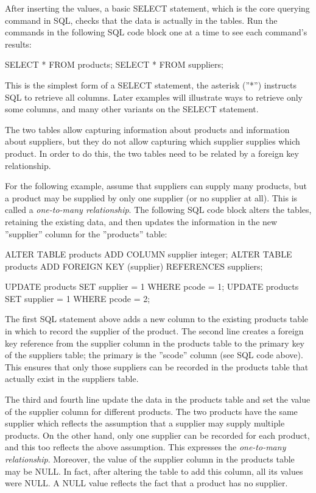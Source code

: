 After inserting the values, a basic SELECT statement, which is the core querying command in SQL, checks that the data is actually in the tables. Run the commands in the following SQL code block one at a time to see each command's results:

\begin{samepage}
\begin{sqlcode}
SELECT * FROM products;
SELECT * FROM suppliers;
\end{sqlcode}
\end{samepage}

This is the simplest form of a SELECT statement, the asterisk (''*'') instructs SQL to retrieve all columns. Later examples will illustrate ways to retrieve only some columns, and many other variants on the SELECT statement.

The two tables allow capturing information about products and information about suppliers, but they do not allow capturing which supplier supplies which product. In order to do this, the two tables need to be related by a foreign key relationship. 

For the following example, assume that suppliers can supply many products, but a product may be supplied by only one supplier (or no supplier at all). This is called a \emph{one-to-many relationship}. The following SQL code block alters the tables, retaining the existing data, and then updates the information in the new ''supplier'' column for the ''products'' table:

\begin{samepage}
\begin{sqlcode}
ALTER TABLE products ADD COLUMN supplier integer;
ALTER TABLE products ADD FOREIGN KEY (supplier) REFERENCES suppliers;

UPDATE products SET supplier = 1 WHERE pcode = 1;
UPDATE products SET supplier = 1 WHERE pcode = 2;
\end{sqlcode}
\end{samepage}

The first SQL statement above adds a new column to the existing products table in which to record the supplier of the product. The second line creates a foreign key reference from the supplier column in the products table to the primary key of the suppliers table; the primary is the ''scode'' column (see SQL code above). This ensures that only those suppliers can be recorded in the products table that actually exist in the suppliers table. 

The third and fourth line update the data in the products table and set the value of the supplier column for different products. The two products have the same supplier which reflects the assumption that a supplier may supply multiple products. On the other hand, only one supplier can be recorded for each product, and this too reflects the above assumption. This expresses the \emph{one-to-many relationship}. Moreover, the value of the supplier column in the products table may be NULL. In fact, after altering the table to add this column, all its values were NULL. A NULL value reflects the fact that a product has no supplier.

